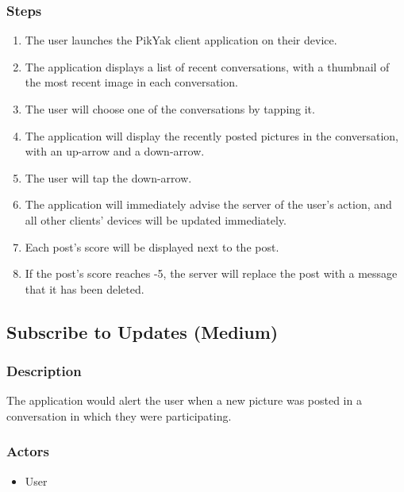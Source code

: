 \documentclass[11pt]{scrartcl}
\begin{document}
        \subsubsection{Steps}
            \begin{enumerate}
                \item The user launches the PikYak client application on their device.
                \item The application displays a list of recent conversations, with a thumbnail of the most recent image in each conversation.
                \item The user will choose one of the conversations by tapping it.
                \item The application will display the recently posted pictures in the conversation, with an up-arrow and a down-arrow.
                \item The user will tap the down-arrow.
                \item The application will immediately advise the server of the user's action, and all other clients' devices will be updated immediately.
                \item Each post's score will be displayed next to the post.
                \item If the post's score reaches -5, the server will replace the post with a message that it has been deleted.
            \end{enumerate}

    \subsection{Subscribe to Updates (Medium)}
    \label{sec:subscribe}
        \subsubsection{Description}
            The application would alert the user when a new picture was posted in a conversation in which they were participating.
        \subsubsection{Actors}
            \begin{itemize}
                \item User
            \end{itemize}
\end{document}
